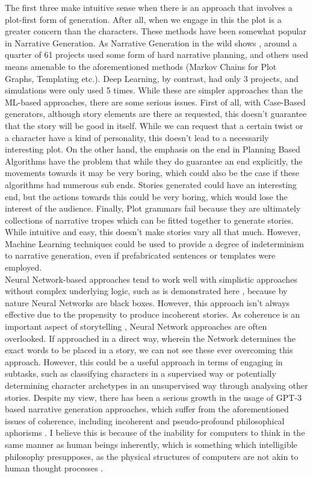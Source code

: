 \documentclass[11pt]{article}
\begin{document}
The first three make intuitive sense when there is an approach that involves a plot-first form of generation. After all, when we engage in this the plot is a greater concern than the characters. These methods have been somewhat popular in Narrative Generation. As Narrative Generation in the wild shows \cite{van-stegeren-theune-2019-narrative}, around a quarter of 61 projects used some form of hard narrative planning, and others used means amenable to the aforementioned methods (Markov Chains for Plot Graphs, Templating etc.). Deep Learning, by contrast, had only 3 projects, and simulations were only used 5 times. While these are simpler approaches than the ML-based approaches, there are some serious issues. First of all, with Case-Based generators, although story elements are there as requested, this doesn't guarantee that the story will be good in itself. While we can request that a certain twist or a character have a kind of personality, this doesn't lead to a necessarily interesting plot. On the other hand, the emphasis on the end in Planning Based Algorithms have the problem that while they do guarantee an end explicitly, the movements towards it may be very boring, which could also be the case if these algorithms had numerous sub ends. Stories generated could have an interesting end, but the actions towards this could be very boring, which would lose the interest of the audience. Finally, Plot grammars fail because they are ultimately collections of narrative tropes which can be fitted together to generate stories. While intuitive and easy, this doesn't make stories vary all that much. However, Machine Learning techniques could be used to provide a degree of indeterminism to narrative generation, even if prefabricated sentences or templates were employed.\\

Neural Network-based approaches tend to work well with simplistic approaches without complex underlying logic, such as is demonstrated here \cite{NeuralNetworkOne}, because by nature Neural Networks are black boxes. However, this approach isn't always effective due to the propensity to produce incoherent stories. As coherence is an important aspect of storytelling \cite{sagarkar-etal-2018-quality}, Neural Network approaches are often overlooked. If approached in a direct way, wherein the Network determines the exact words to be placed in a story, we can not see these ever overcoming this approach. However, this could be a useful approach in terms of engaging in subtasks, such as classifying characters in a supervised way or potentially determining character archetypes in an unsupervised way through analysing other stories. Despite my view, there has been a serious growth in the usage of GPT-3 based narrative generation approaches, which suffer from the aforementioned issues of coherence, including incoherent and pseudo-profound philosophical aphorisms \cite{GPTStori0:online}. I believe this is because of the inability for computers to think in the same manner as human beings inherently, which is something which intelligible philosophy presupposes, as the physical structures of computers are not akin to human thought processes \cite{Feser2013-FESKRA} \cite{ross1992immaterial}.\\
\end{document}
